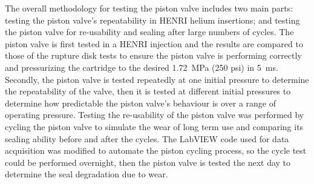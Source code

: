 
The overall methodology for testing the piston valve includes two main parts: testing the piston valve's repeatability in HENRI helium insertions; and testing the piston valve for re-usability and sealing after large numbers of cycles. The piston valve is first tested in a HENRI injection and the results are compared to those of the rupture disk tests to ensure the piston valve is performing correctly and pressurizing the cartridge to the desired \SI{1.72}{\mega\pascal} (250 psi) in \SI{5}{\milli\second}. Secondly, the piston valve is tested repeatedly at one initial pressure to determine the repeatability of the valve, then it is tested at different initial pressures to determine how predictable the piston valve's behaviour is over a range of operating pressure. Testing the re-usability of the piston valve was performed by cycling the piston valve to simulate the wear of long term use and comparing its sealing ability before and after the cycles. The LabVIEW code used for data acquisition was modified to automate the piston cycling process, so the cycle test could be performed overnight, then the piston valve is tested the next day to determine the seal degradation due to wear.